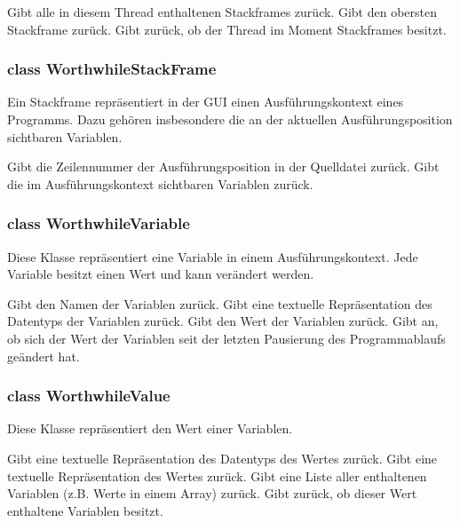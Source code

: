 \begin{description}
	 Gibt alle in diesem Thread enthaltenen Stackframes zurück.
	 Gibt den obersten Stackframe zurück.
	 Gibt zurück, ob der Thread im Moment Stackframes besitzt.
\end{description}

\subsubsection{class WorthwhileStackFrame}

Ein Stackframe repräsentiert in der GUI einen Ausführungskontext eines Programms. Dazu gehören insbesondere die an der aktuellen Ausführungsposition sichtbaren Variablen.

\begin{description}
	 Gibt die Zeilennummer der Ausführungsposition in der Quelldatei zurück.
	 Gibt die im Ausführungskontext sichtbaren Variablen zurück.
\end{description}

\subsubsection{class WorthwhileVariable}

Diese Klasse repräsentiert eine Variable in einem Ausführungskontext. Jede Variable besitzt einen Wert und kann verändert werden.

\begin{description}
	 Gibt den Namen der Variablen zurück.
	 Gibt eine textuelle Repräsentation des Datentyps der Variablen zurück.
	 Gibt den Wert der Variablen zurück.
	 Gibt an, ob sich der Wert der Variablen seit der letzten Pausierung des Programmablaufs geändert hat.
\end{description}

\subsubsection{class WorthwhileValue}

Diese Klasse repräsentiert den Wert einer Variablen.

\begin{description}
	 Gibt eine textuelle Repräsentation des Datentyps des Wertes zurück.
	 Gibt eine textuelle Repräsentation des Wertes zurück.
	 Gibt eine Liste aller enthaltenen Variablen (z.B. Werte in einem Array) zurück.
	 Gibt zurück, ob dieser Wert enthaltene Variablen besitzt.
\end{description}

